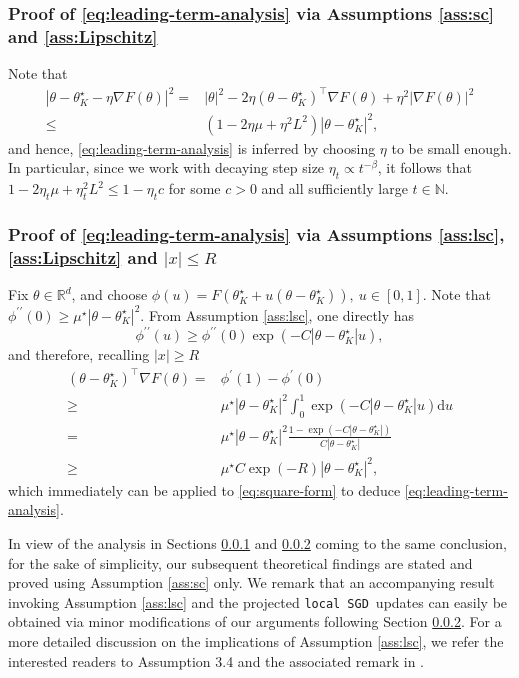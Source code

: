 \documentclass[a4paper,11pt]{article}
\numberwithin{equation}{section}
\theoremstyle{plain}
\theoremstyle{remark}
\def\R{\mathbb{R}}
\def\N{\mathbb{N}}
\newcommand{\DFL}{\texttt{local SGD}}
\newcommand{\minparam}{\theta^\star_K}
\begin{document}
\subsubsection{Proof of \eqref{eq:leading-term-analysis} via Assumptions \ref{ass:sc} and \ref{ass:Lipschitz}}\label{se:sc}
Note that
\begin{align}
    |\theta - \minparam - \eta \nabla F(\theta)|^2 =& |\theta|^2 - 2 \eta (\theta - \minparam)^\top \nabla F(\theta) +  \eta^2 |\nabla F(\theta)|^2 \nonumber\\ 
    \leq & (1 - 2\eta \mu + \eta^2 L^2) |\theta - \minparam|^2,\label{eq:square-form}
\end{align}
and hence, \eqref{eq:leading-term-analysis} is inferred by choosing $\eta$ to be small enough. In particular, since we work with decaying step size $\eta_t \propto t^{-\beta}$, it follows that $1 - 2\eta_t \mu + \eta_t^2 L^2 \leq 1-\eta_tc$ for some $c>0$ and all sufficiently large $t\in \N$.
\subsubsection{Proof of \eqref{eq:leading-term-analysis} via Assumptions \ref{ass:lsc}, \ref{ass:Lipschitz} and $|x|\leq R$} \label{se:lsc}
Fix $\theta \in \R^d$, and choose $\phi(u) = F(\minparam+ u(\theta- \minparam)), \ u\in[0,1].$ Note that $\phi^{\prime\prime}(0) \geq  \mu^{\star} |\theta-\minparam|^2$. From Assumption \ref{ass:lsc}, one directly has
\[ \phi^{\prime \prime}(u) \geq  \phi^{\prime \prime}(0) \exp(-C|\theta- \minparam|u), \]
and therefore, recalling $|x|\geq R$
\begin{align}
(\theta - \minparam)^\top \nabla F(\theta) = &\phi^\prime(1)- \phi^\prime(0) \nonumber\\ \geq & \mu^{\star} |\theta-\minparam|^2\int_0^1 \exp(-C|\theta- \minparam|u) \text{d}u \nonumber\\
= & \mu^{\star} |\theta-\minparam|^2 \frac{1 - \exp(-C|\theta- \minparam|)}{C|\theta- \minparam|}\nonumber\\
\geq & \mu^{\star} C\exp(-R) |\theta-\minparam|^2 ,
\end{align} 
which immediately can be applied to \eqref{eq:square-form} to deduce \eqref{eq:leading-term-analysis}.

In view of the analysis in Sections \ref{se:sc} and \ref{se:lsc} coming to the same conclusion, for the sake of simplicity, our subsequent theoretical findings are stated and proved using Assumption \ref{ass:sc} only. We remark that an accompanying result invoking Assumption \ref{ass:lsc} and the projected \DFL\ updates can easily be obtained via minor modifications of our arguments following Section \ref{se:lsc}. For a more detailed discussion on the implications of Assumption \ref{ass:lsc}, we refer the interested readers to Assumption 3.4 and the associated remark in \cite{songxichen2024}. 
\end{document}
